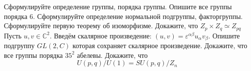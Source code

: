 \documentclass[a5paper, landscape]{exam}
\begin{document}
			\firstpageheadrule
\vspace*{0.5cm}
\vspace*{0.5cm}
\begin{questions}
\question	Сформулируйте определение группы, порядка группы. Опишите все группы порядка 6.
\question   Сформулируйте определение нормальной подгруппы, факторгруппы. Сформулируйте первую теорему об изоморфизме. Докажите, что $Z_p \times Z_q \simeq Z_{pq}$
\question 	Пусть $u, v \in \mathbb{C}^2$. Введём скалярное произведение: $(u,v) = \varepsilon^{\alpha\beta} u_\alpha v_\beta$.
Опишите подгруппу $GL(2,C)$ которая сохраняет скалярное произведение.
\question   Докажите, что все группы порядка $35^2$ абелевы.
\question   Докажите, что
\[
	U(p,q) / U(1) = SU(p,q)/Z_n
\]
\end{questions}
\end{document}
